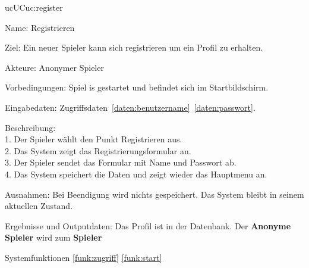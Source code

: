 \begin{description}[leftmargin=5em, style=sameline]

	\begin{lhp}{uc}{UC}{uc:register}
		\item [Name:] Registrieren
		\item [Ziel:] Ein neuer Spieler kann sich registrieren um ein Profil zu erhalten.
		\item [Akteure:] Anonymer Spieler
		\item [Vorbedingungen:] Spiel is gestartet und befindet sich im Startbildschirm.
		\item [Eingabedaten:] Zugriffsdaten~\ref{daten:benutzername}~\ref{daten:passwort}.
		\item [Beschreibung:] \hfill\\
				1. Der Spieler wählt den Punkt Registrieren aus.\\
				2. Das System zeigt das Registrierungsformular an.\\
				3. Der Spieler sendet das Formular mit Name und Passwort ab.\\
				4. Das System speichert die Daten und zeigt wieder das Hauptmenu an.\\
		\item [Ausnahmen:] Bei Beendigung wird nichts gespeichert. Das System bleibt in seinem aktuellen Zustand.
		\item [Ergebnisse und Outputdaten:] Das Profil ist in der Datenbank. Der \textbf{Anonyme Spieler} wird zum \textbf{Spieler}
		\item [Systemfunktionen] \ref{funk:zugriff} \ref{funk:start}
	\end{lhp}


\end{description}
